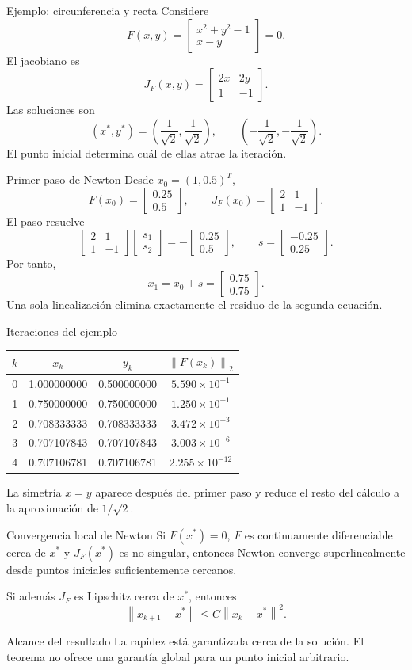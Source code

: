 \documentclass[aspectratio=169,12pt]{beamer}
\newcommand{\mat}[1]{\begin{bmatrix}#1\end{bmatrix}}
\newcommand{\norm}[1]{\left\lVert#1\right\rVert}
\begin{document}
\begin{frame}{Ejemplo: circunferencia y recta}
Considere
\[
F(x,y)=
\mat{x^2+y^2-1\\x-y}=0.
\]
El jacobiano es
\[
J_F(x,y)=\mat{2x&2y\\1&-1}.
\]
Las soluciones son
\[
(x^*,y^*)=\left(\frac{1}{\sqrt2},\frac{1}{\sqrt2}\right),
\qquad
\left(-\frac{1}{\sqrt2},-\frac{1}{\sqrt2}\right).
\]
El punto inicial determina cuál de ellas atrae la iteración.
\end{frame}

\begin{frame}{Primer paso de Newton}
Desde $x_0=(1,0.5)^T$,
\[
F(x_0)=\mat{0.25\\0.5},
\qquad
J_F(x_0)=\mat{2&1\\1&-1}.
\]
El paso resuelve
\[
\mat{2&1\\1&-1}\mat{s_1\\s_2}
=-\mat{0.25\\0.5},
\qquad
s=\mat{-0.25\\0.25}.
\]
Por tanto,
\[
x_1=x_0+s=\mat{0.75\\0.75}.
\]
Una sola linealización elimina exactamente el residuo de la segunda ecuación.
\end{frame}

\begin{frame}{Iteraciones del ejemplo}
\centering
\begin{tabular}{cccc}
\toprule
$k$ & $x_k$ & $y_k$ & $\norm{F(x_k)}_2$ \\
\midrule
0 & 1.000000000 & 0.500000000 & $5.590\times10^{-1}$ \\
1 & 0.750000000 & 0.750000000 & $1.250\times10^{-1}$ \\
2 & 0.708333333 & 0.708333333 & $3.472\times10^{-3}$ \\
3 & 0.707107843 & 0.707107843 & $3.003\times10^{-6}$ \\
4 & 0.707106781 & 0.707106781 & $2.255\times10^{-12}$ \\
\bottomrule
\end{tabular}
\vspace{0.4cm}

La simetría $x=y$ aparece después del primer paso y reduce el resto del cálculo
a la aproximación de $1/\sqrt2$.
\end{frame}

\begin{frame}{Convergencia local de Newton}
Si $F(x^*)=0$, $F$ es continuamente diferenciable cerca de $x^*$ y
$J_F(x^*)$ es no singular, entonces Newton converge superlinealmente desde
puntos iniciales suficientemente cercanos.

Si además $J_F$ es Lipschitz cerca de $x^*$, entonces
\[
\norm{x_{k+1}-x^*}\leq C\norm{x_k-x^*}^2.
\]
\begin{block}{Alcance del resultado}
La rapidez está garantizada cerca de la solución. El teorema no ofrece una
garantía global para un punto inicial arbitrario.
\end{block}
\end{frame}
\end{document}

